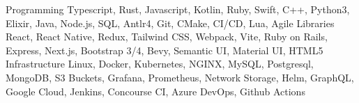 \begin{cvskills}
  \cvskill
    {Programming}
    {Typescript, Rust, Javascript, Kotlin, Ruby, Swift, C++, Python3, Elixir, Java, Node.js, SQL, Antlr4, Git, CMake, CI/CD, Lua, Agile}
  \cvskill
    {Libraries}
    {React, React Native, Redux, Tailwind CSS, Webpack, Vite, Ruby on Rails, Express, Next.js, Bootstrap 3/4, Bevy, Semantic UI, Material UI, HTML5}
  \cvskill
    {Infrastructure}
    {Linux, Docker, Kubernetes, NGINX, MySQL, Postgresql, MongoDB, S3 Buckets, Grafana, Prometheus, Network Storage, Helm, GraphQL, Google Cloud, Jenkins, Concourse CI, Azure DevOps, Github Actions}
\end{cvskills}
